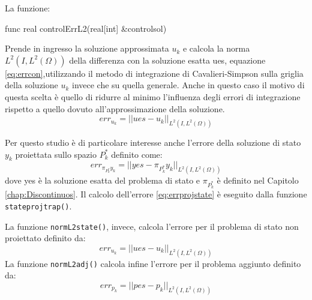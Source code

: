 La funzione:
\begin{Code}[caption={Funzione \texttt{controlErrL2}}]
func real controlErrL2(real[int] &controlsol)
\end{Code}
Prende in ingresso la soluzione approssimata $u_k$ e calcola la norma $L^2(I,L^2(\Omega))$ della differenza con la soluzione esatta ues, equazione \eqref{eq:errcon},utilizzando il metodo di integrazione di Cavalieri-Simpson sulla griglia della soluzione $u_k$ invece che su quella generale. Anche in questo caso il motivo di questa scelta è quello di ridurre al minimo l'influenza degli errori di integrazione rispetto a quello dovuto all'approssimazione della soluzione.
\begin{equation}
err_{u_k} = || ues - u_k ||_{L^2(I,L^2(\Omega))}
\label{eq:errcon}
\end{equation}
\par
Per questo studio è di particolare interesse anche l'errore della soluzione di stato $y_k$ proiettata sullo spazio $P^*_k$ definito come:
\begin{equation}
err_{\pi_{P^*_k}y_k} = || yes - \pi_{P^*_k}y_k ||_{L^2(I,L^2(\Omega))}
\label{eq:errprojstate}
\end{equation}
dove yes è la soluzione esatta del problema di stato e $\pi_{P^*_k}$ è definito nel Capitolo \ref{chap:Discontinuos}.
Il calcolo dell'errore \eqref{eq:errprojstate} è eseguito dalla funzione \texttt{stateprojtrap()}.
\par
La funzione \texttt{normL2state()}, invece, calcola l'errore per il problema di stato non proiettato definito da:
\begin{equation}
err_{u_k} = || ues - u_k ||_{L^2(I,L^2(\Omega))}
\label{eq:errstate}
\end{equation}
La funzione \texttt{normL2adj()} calcola infine l'errore per il problema aggiunto definito da:
\begin{equation}
err_{p_k} = || pes - p_k ||_{L^2(I,L^2(\Omega))}
\label{eq:erradj}
\end{equation}

